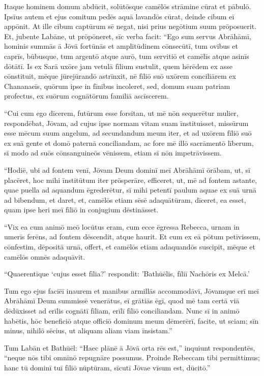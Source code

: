 \Versus Itaque hominem domum abdūcit, solūtōsque camēlōs strāmine cūrat et pābulō. Ipsīus autem et ejus comitum pedēs aquā lavandōs cūrat,
\Versus deinde cibum eī appōnit. At ille cibum captūrum sē negat, nisi prius negōtium suum prōposuerit. Et, jubente Labāne, ut prōpōneret,
\Versus sīc verba facit: ``Ego sum servus Abrāhāmī,
\Versus hominis summās ā Jōvā fortūnās et amplitūdinem cōnsecūtī, tum ovibus et caprīs, būbusque, tum argentō atque aurō, tum servitiō et camēlīs atque asinīs dōtātī.
\Versus Is ex Sarā uxōre jam vetulā fīlium sustulit, quem hērēdem ex asse cōnstituit,
\Versus mēque jūrejūrandō astrīnxit, nē fīliō suō uxōrem conciliārem ex Chananaeīs, quōrum ipse in fīnibus incoleret,
\Versus sed, domum suam patriam profectus, ex suōrum cognātōrum familiā ascīscerem.

\Versus ``Cui cum ego dīcerem, futūrum esse forsitan, ut mē nōn sequerētur mulier,
\Versus respondēbat, Jōvam, ad cujus ipse normam vītam suam īnstituisset, missūrum esse mēcum suum angelum, ad secundandum meum iter, et ad uxōrem fīliō suō ex suā gente et domō paternā conciliandam,
\Versus ac fore mē illō sacrāmentō līberum, sī modo ad suōs cōnsanguineōs vēnissem, etiam sī nōn impetrāvissem.

\Versus ``Hodiē, ubi ad fontem venī, Jōvam Deum dominī meī Abrāhāmī ōrābam, ut, sī placēret, hoc mihi īnstitūtum iter prōsperāre, efficeret,
\Versus ut, mē ad fontem astante, quae puella ad aquandum ēgrederētur, sī mihi petentī paulum aquae ex suā urnā ad bibendum,
\Versus et daret, et, camēlōs etiam sēsē adaquātūram, dīceret, ea esset, quam ipse heri meī fīliō in conjugium dēstināsset.

\Versus ``Vix ea cum animō meō locūtus eram, cum ecce ēgressa Rebecca, urnam in umerīs ferēns, ad fontem dēscendit, atque haurit. Et cum ex eā pōtum petīvissem,
\Versus cōnfestim, dēpositā urnā, offert, et camēlōs etiam adaquandōs suscipit, mēque et camēlōs omnēs adaquāvit.

\Versus ``Quaerentīque `cujus esset fīlia?' respondit: 'Bathūēlis, fīliī Nachōris ex Melcā.'

Tum ego ejus faciēī inaurem et manibus armillās accommodāvī,
\Versus Jōvamque erī meī Abrāhāmī Deum summissē venerātus, eī grātiās ēgī, quod mē tam certā viā dēdūxisset ad erīlis cognātī fīliam, erīlī fīliō conciliandam.
\Versus Nunc sī in animō habētis, hōc beneficiō atque officiō dominum meum dēmerērī, facite, ut sciam; sīn minus, nihilō sēcius, ut aliquam aliam viam īnsistam.''

\Versus Tum Labān et Bathūēl: ``Haec plānē ā Jōvā orta rēs est,'' inquiunt respondentēs, ``neque nōs tibi omnīnō repugnāre possumus.
\Versus Proinde Rebeccam tibi permittimus; hanc tū dominī tuī fīliō nūptūram, sīcutī Jōvae vīsum est, dūcitō.''

